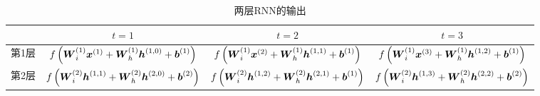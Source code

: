 \documentclass{../notes}
\begin{document}
    \begin{table}[ht]
        \centering
        \small
        \caption{两层RNN的输出}
        \begin{tabular}{cccc}
            \toprule
            & $t = 1$ & $t = 2$ & $t = 3$ \\
            \midrule
            第1层 & $f\left(\boldsymbol W^{(1)}_i \boldsymbol x^{(1)} + \boldsymbol W^{(1)}_h \boldsymbol h^{(1, 0)} + \boldsymbol b^{(1)}\right) $ & $f\left(\boldsymbol W^{(1)}_i \boldsymbol x^{(2)} + \boldsymbol W^{(1)}_h \boldsymbol h^{(1, 1)} + \boldsymbol b^{(1)}\right) $ & $f\left(\boldsymbol W^{(1)}_i \boldsymbol x^{(3)} + \boldsymbol W^{(1)}_h \boldsymbol h^{(1, 2)} + \boldsymbol b^{(1)}\right)$ \\
            第2层 & $f\left(\boldsymbol W^{(2)}_i \boldsymbol h^{(1, 1)} + \boldsymbol W^{(2)}_h \boldsymbol h^{(2, 0)} + \boldsymbol b^{(2)}\right)$ & $f\left(\boldsymbol W^{(2)}_i \boldsymbol h^{(1, 2)} + \boldsymbol W^{(2)}_h \boldsymbol h^{(2, 1)} + \boldsymbol b^{(1)}\right)$ & $f\left(\boldsymbol W^{(2)}_i \boldsymbol h^{(1, 3)} + \boldsymbol W^{(2)}_h \boldsymbol h^{(2, 2)} + \boldsymbol b^{(2)}\right)$ \\
            \bottomrule
        \end{tabular}
        \label{tbl:rnn-result-1}
    \end{table}
\end{document}
